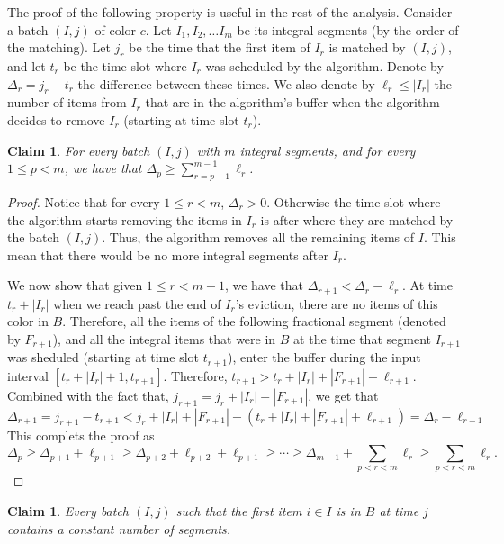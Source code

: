 \documentclass[12pt]{article}
\newtheorem{claim}[theorem]{Claim}
\begin{document}
The proof of the following property is useful
in the rest of the analysis.
Consider a batch $(I,j)$ of color $c$.  
Let $I_1,I_2,\ldots I_m$ be its integral segments
(by the order of the matching).
Let $j_r$ be the time that the first item of $I_r$ is matched by $(I,j)$,
and let $t_r$ be the time slot where $I_r$ was scheduled by the algorithm.
Denote by  $\Delta_r=j_r-t_r$ the difference between these times.
We also denote by $\ell_r\le|I_r|$ the number of items from $I_r$
that are in the algorithm's buffer when the algorithm decides to
remove $I_r$ (starting at time slot $t_r$).

\begin{claim}\label{cl: delta_p}
For every batch $(I,j)$ with $m$ integral segments, and
for every $1\le p<m$, we have that $\Delta_p\ge\sum_{r=p+1}^{m-1}{\ell_r}$.
\end{claim}

\begin{proof}
Notice that for every $1\le r<m$, $\Delta_r>0$. 
Otherwise the time slot where the algorithm starts removing the items 
in $I_r$ is after where they are matched by the batch $(I,j)$.
Thus, the algorithm removes all the remaining items of $I$. 
This mean that there would be no more integral segments after $I_r$. 

We now show that given $1\le r< m-1$, we have that
$\Delta_{r+1}<\Delta_{r}-\ell_r$. 
At time $t_r+|I_r|$ when we reach past the end of $I_r$'s
eviction, there are no items of this color in $B$. Therefore, all the items 
of the following fractional segment (denoted by $F_{r+1}$), 
and all the integral items that were in $B$ at the time
that segment $I_{r+1}$ was sheduled (starting at time slot $t_{r+1}$), 
enter the buffer during the input interval $[t_r+|I_r|+1, t_{r+1}]$. 
Therefore,
$t_{r+1}> t_r+|I_r|+|F_{r+1}|+\ell_{r+1}$.
Combined with the fact that,
$j_{r+1}=j_r+|I_r|+|F_{r+1}|$, we get that
$$
\Delta_{r+1}=j_{r+1}-t_{r+1}  
< j_r+|I_r|+|F_{r+1}|- \left( t_r+|I_r|+|F_{r+1}|+\ell_{r+1} \right) 
=\Delta_{r} -\ell_{r+1}
$$
This complets the proof as
$$
\Delta_p \ge \Delta_{p+1}+\ell_{p+1}\ge\Delta_{p+2}+\ell_{p+2}+\ell_{p+1}
\ge\cdots\ge\Delta_{m-1}+\sum_{p<r< m}{\ell_r}\ge \sum_{p<r< m}{\ell_r}.
$$
\end{proof}

\begin{claim}\label{cl: batch before alg}
Every batch $(I,j)$ such that the first item $i\in I$ is in $B$
at time $j$ contains a constant number of segments.
\end{claim}
\end{document}
